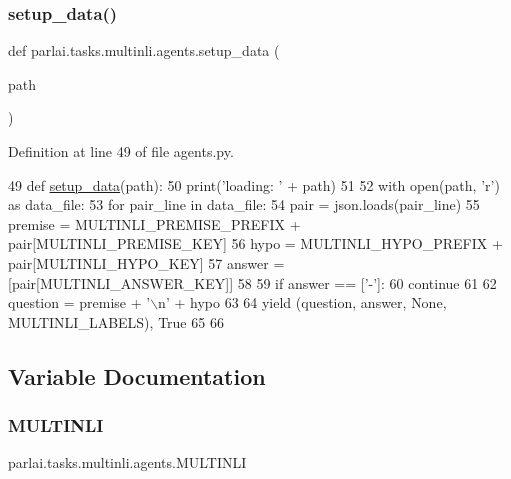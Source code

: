 \subsubsection{\texorpdfstring{setup\+\_\+data()}{setup\_data()}}
{\footnotesize\ttfamily def parlai.\+tasks.\+multinli.\+agents.\+setup\+\_\+data (\begin{DoxyParamCaption}\item[{}]{path }\end{DoxyParamCaption})}



Definition at line 49 of file agents.\+py.


\begin{DoxyCode}
49 \textcolor{keyword}{def }\hyperlink{namespaceparlai_1_1tasks_1_1multinli_1_1agents_a4fa2cb0ba1ed745336ad8bceed36b841}{setup\_data}(path):
50     print(\textcolor{stringliteral}{'loading: '} + path)
51 
52     with open(path, \textcolor{stringliteral}{'r') as data\_file:}
53 \textcolor{stringliteral}{        }\textcolor{keywordflow}{for} pair\_line \textcolor{keywordflow}{in} data\_file:
54             pair = json.loads(pair\_line)
55             premise = MULTINLI\_PREMISE\_PREFIX + pair[MULTINLI\_PREMISE\_KEY]
56             hypo = MULTINLI\_HYPO\_PREFIX + pair[MULTINLI\_HYPO\_KEY]
57             answer = [pair[MULTINLI\_ANSWER\_KEY]]
58 
59             \textcolor{keywordflow}{if} answer == [\textcolor{stringliteral}{'-'}]:
60                 \textcolor{keywordflow}{continue}
61 
62             question = premise + \textcolor{stringliteral}{'\(\backslash\)n'} + hypo
63 
64             \textcolor{keywordflow}{yield} (question, answer, \textcolor{keywordtype}{None}, MULTINLI\_LABELS), \textcolor{keyword}{True}
65 
66 
\end{DoxyCode}


\subsection{Variable Documentation}
\mbox{\label{namespaceparlai_1_1tasks_1_1multinli_1_1agents_a5edb36dd327dda4e95e5851ac53a21c9}} 
\subsubsection{\texorpdfstring{M\+U\+L\+T\+I\+N\+LI}{MULTINLI}}
{\footnotesize\ttfamily parlai.\+tasks.\+multinli.\+agents.\+M\+U\+L\+T\+I\+N\+LI}



